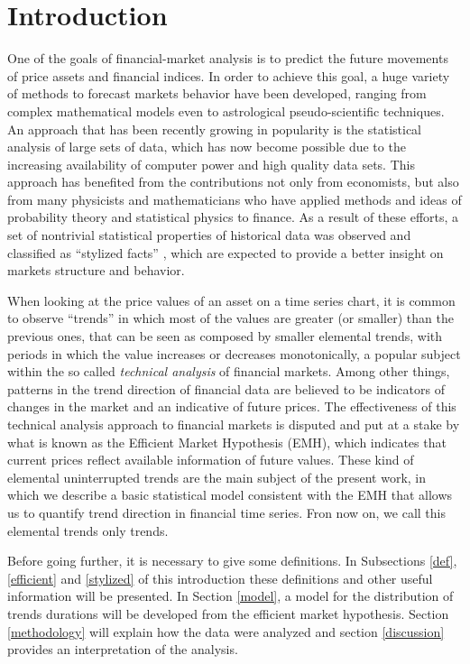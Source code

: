 \documentclass[a4paper]{jpconf}
\begin{document}
\section{Introduction}
\label{intro}
One of the goals of financial-market analysis is to predict the future movements of price assets and financial indices. In order to achieve this goal, a huge variety of methods to forecast markets behavior have been developed, ranging from complex mathematical models even to astrological pseudo-scientific techniques. An approach that has been recently growing in popularity is the statistical analysis of large sets of data, which has now become possible due to the increasing availability of computer power and high quality data sets. This approach has benefited from the contributions not only from economists, but also from many physicists and mathematicians who have applied methods and ideas of probability theory and statistical physics to finance. As a result of these efforts, a set of nontrivial statistical properties of historical data was observed and classified as ``stylized facts'' \cite{Rama}, which are expected to provide a better insight on markets structure and behavior.

When looking at the price values of an asset on a time series chart, it is common to observe ``trends'' in which most of the values are greater (or smaller) than the previous ones, that can be seen as composed by smaller elemental trends, with periods in which the value increases or decreases monotonically, a popular subject within the so called \emph{technical analysis} of financial markets. Among other things, patterns in the trend direction of financial data are believed to be indicators of changes in the market and an indicative of future prices. The effectiveness of this technical analysis approach to financial markets is disputed and put at a stake by what is known as the Efficient Market Hypothesis (EMH), which indicates that current prices reflect available information of future values. These kind of elemental uninterrupted trends are the main subject of the present work, in which we describe a basic statistical model consistent with the EMH that allows us to quantify trend direction in financial time series. Fron now on, we call this elemental trends only trends.

Before going further, it is necessary to give some definitions. In Subsections \ref{def}, \ref{efficient} and \ref{stylized} of this introduction these definitions and other useful information will be presented. In Section \ref{model}, a model for the distribution of trends durations will be developed from the efficient market hypothesis. Section \ref{methodology} will explain how the data were analyzed and section \ref{discussion} provides an interpretation of the analysis.
\end{document}
